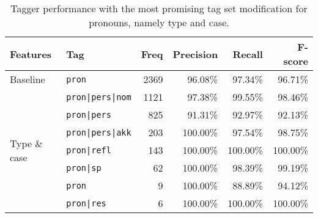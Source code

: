 \documentclass[a4paper,12pt,english]{book}
\begin{document}
\begin{table}
    \centering
    \smaller[0.5]
    \begin{tabular}{@{}llrrrr@{}}
        \toprule
        \textbf{Features} & \textbf{Tag} & \textbf{Freq} & \textbf{Precision} &
        \textbf{Recall} & \textbf{F-score} \\
        \midrule
        Baseline & \texttt{pron} & 2369 & 96.08\% & 97.34\% & 96.71\% \\
        \midrule
        \multirow{7}{*}{Type \& case}
        & \texttt{pron|pers|nom} & 1121 & 97.38\% & 99.55\% & 98.46\% \\
        & \texttt{pron|pers} & 825 & 91.31\% & 92.97\% & 92.13\% \\
        & \texttt{pron|pers|akk} & 203 & 100.00\% & 97.54\% & 98.75\% \\
        & \texttt{pron|refl} & 143 & 100.00\% & 100.00\% & 100.00\% \\
        & \texttt{pron|sp} & 62 & 100.00\% & 98.39\% & 99.19\% \\
        & \texttt{pron} & 9 & 100.00\% & 88.89\% & 94.12\% \\
        & \texttt{pron|res} & 6 & 100.00\% & 100.00\% & 100.00\% \\
        \bottomrule
    \end{tabular}
    \caption{Tagger performance with the most promising tag set
        modification for pronouns, namely type and case.}
    \label{prontagerror}
\end{table}

\end{document}
